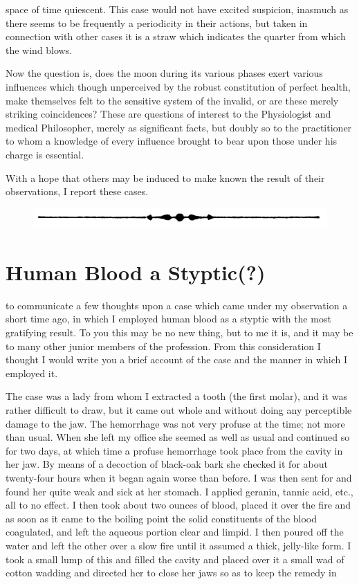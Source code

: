 space of time quiescent. This case would not have excited suspicion,
inasmuch as there seems to be frequently a periodicity in their
actions, but taken in connection with other cases it is a straw which
indicates the quarter from which the wind blows.

Now the question is, does the moon during its various phases exert
various influences which though unperceived by the robust constitution
of perfect health, make themselves felt to the sensitive system
of the invalid, or are these merely striking coincidences? These are
questions of interest to the Physiologist and medical Philosopher,
merely as significant facts, but doubly so to the practitioner to whom
a knowledge of every influence brought to bear upon those under his
charge is essential.

With a hope that others may be induced to make known the result
of their observations, I report these cases.

\begin{figure}[H]
  \centering
  \includegraphics{pages/illustrations/arrow_bullet_divider.jpg}
\end{figure}

\section*{Human Blood a Styptic(?)}


 to communicate a few thoughts upon a case which came under
my observation a short time ago, in which I employed human blood as
a styptic with the most gratifying result. To you this may be no new
thing, but to me it is, and it may be to many other junior members of
the profession. From this consideration I thought I would write you
a brief account of the case and the manner in which I employed it.

The case was a lady from whom I extracted a tooth (the first molar),
and it was rather difficult to draw, but it came out whole and without
doing any perceptible damage to the jaw. The hemorrhage was not
very profuse at the time; not more than usual. When she left my office
she seemed as well as usual and continued so for two days, at which
time a profuse hemorrhage took place from the cavity in her jaw. By
means of a decoction of black-oak bark she checked it for about twenty-four
hours when it began again worse than before. I was then sent for
and found her quite weak and sick at her stomach. I applied geranin,
tannic acid, etc., all to no effect. I then took about two ounces of blood,
placed it over the fire and as soon as it came to the boiling point the
solid constituents of the blood coagulated, and left the aqueous portion
clear and limpid. I then poured off the water and left the other over
a slow fire until it assumed a thick, jelly-like form. I took a small lump
of this and filled the cavity and placed over it a small wad of cotton
wadding and directed her to close her jaws so as to keep the remedy in\endinput
